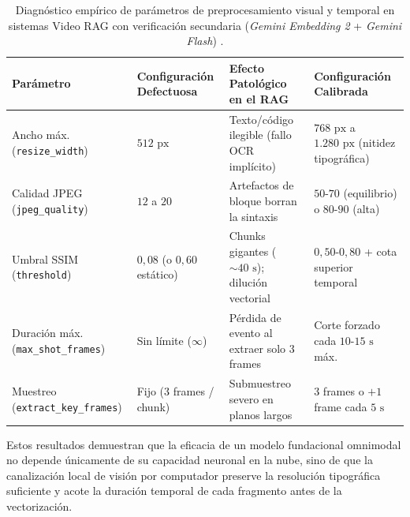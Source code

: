 \begin{table}[htbp]
\centering
\small
\setlength{\tabcolsep}{4.5pt}
\caption{Diagnóstico empírico de parámetros de preprocesamiento visual y temporal en sistemas Video RAG con verificación secundaria (\textit{Gemini Embedding 2} + \textit{Gemini Flash}) \cite{gemini_emb2_docs}.} %
\label{tab:diagnostico_parametros_visuales}
\begin{tabularx}{\linewidth}{>{\raggedright\arraybackslash}p{3.4cm} >{\raggedright\arraybackslash}p{3.0cm} >{\raggedright\arraybackslash}X >{\raggedright\arraybackslash}p{4.6cm}}
\toprule
\textbf{Parámetro} & \textbf{Configuración Defectuosa} & \textbf{Efecto Patológico en el RAG} & \textbf{Configuración Calibrada} \\
\midrule
Ancho máx. (\texttt{resize\_width}) & $512\text{ px}$ & Texto/código ilegible (fallo OCR implícito) & $768\text{ px}$ a $1.280\text{ px}$ (nitidez tipográfica) \\
Calidad JPEG (\texttt{jpeg\_quality}) & $12$ a $20$ & Artefactos de bloque borran la sintaxis & $50\text{-}70$ (equilibrio) o $80\text{-}90$ (alta) \\
Umbral SSIM (\texttt{threshold}) & $0,08$ (o $0,60$ estático) & Chunks gigantes ($\sim 40\text{ s}$); dilución vectorial & $0,50\text{-}0,80$ + cota superior temporal \\
Duración máx. (\texttt{max\_shot\_frames}) & Sin límite ($\infty$) & Pérdida de evento al extraer solo 3 frames & Corte forzado cada $10\text{-}15\text{ s}$ máx. \\
Muestreo (\texttt{extract\_key\_frames}) & Fijo ($3$ frames / chunk) & Submuestreo severo en planos largos & $3$ frames o $+1$ frame cada $5\text{ s}$ \\
\bottomrule
\end{tabularx}
\end{table}

Estos resultados demuestran que la eficacia de un modelo fundacional omnimodal no depende únicamente de su capacidad neuronal en la nube, sino de que la canalización local de visión por computador preserve la resolución tipográfica suficiente y acote la duración temporal de cada fragmento antes de la vectorización. %